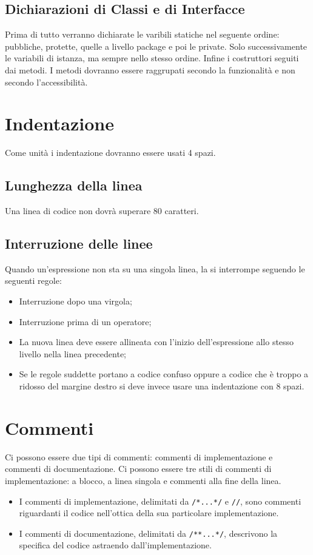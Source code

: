 \documentclass[11pt,titlepage,a4paper]{report}
\begin{document}
\subsection{Dichiarazioni di Classi e di Interfacce}
Prima di tutto verranno dichiarate le varibili statiche nel seguente ordine: pubbliche, protette, quelle a livello package e poi le private. Solo successivamente le variabili di istanza, ma sempre nello stesso ordine. Infine i costruttori seguiti dai metodi. I metodi dovranno essere raggrupati secondo la funzionalit\`a e non secondo l'accessibilit\`a.


\section{Indentazione}
Come unit\`a i indentazione dovranno essere usati 4 spazi.
\subsection{Lunghezza della linea}
Una linea di codice non dovr\`a superare 80 caratteri.
\subsection{Interruzione delle linee}
Quando un'espressione non sta su una singola linea, la si interrompe seguendo le seguenti regole:
\begin{itemize}
\item Interruzione dopo una virgola;
\item Interruzione prima di un operatore;
\item La nuova linea deve essere allineata con l'inizio dell'espressione allo stesso livello nella linea precedente;
\item Se le regole suddette portano a codice confuso oppure a codice che è troppo a ridosso del margine destro si deve invece usare una indentazione con 8 spazi.
\end{itemize}


\section{Commenti}
Ci possono essere due tipi di commenti: commenti di implementazione e commenti di documentazione. 
Ci possono essere tre stili di commenti di implementazione: a blocco, a linea singola e commenti alla fine della linea.
\begin{itemize}
\item I commenti di implementazione, delimitati da \texttt{/*...*/} e \texttt{//}, sono commenti riguardanti il codice nell'ottica della sua particolare implementazione. 
\item I commenti di documentazione, delimitati da \texttt{/**...*/}, descrivono la specifica del codice astraendo dall'implementazione.
\end{itemize}
\end{document}
